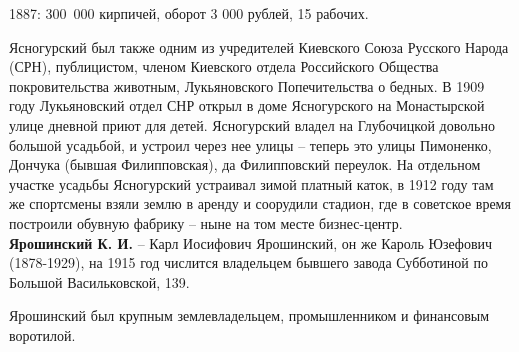 1887: \mbox{300 000} кирпичей, оборот 3 000 рублей, 15 рабочих.

Ясногурский был также одним из учредителей Киевского Союза Русского Народа (СРН), публицистом, членом Киевского отдела Российского Общества покровительства животным, Лукьяновского Попечительства о бедных. В 1909  году Лукьяновский отдел СНР открыл в доме Ясногурского на Монастырской улице дневной приют для детей. Ясногурский владел на Глубочицкой довольно большой усадьбой, и устроил через нее улицы – теперь это улицы Пимоненко, Дончука (бывшая Филипповская), да Филипповский переулок. На отдельном участке усадьбы Ясногурский устраивал зимой платный каток, в 1912 году там же спортсмены взяли землю в аренду и соорудили стадион, где в советское время построили обувную фабрику – ныне на том месте бизнес-центр.\\

\noindent\textbf{Ярошинский К. И.} – Карл Иосифович Ярошинский, он же Кароль Юзефович (1878-1929), на 1915 год числится владельцем бывшего завода Субботиной по Большой Васильковской, 139. 

Ярошинский был крупным землевладельцем, промышленником и финансовым воротилой.\\